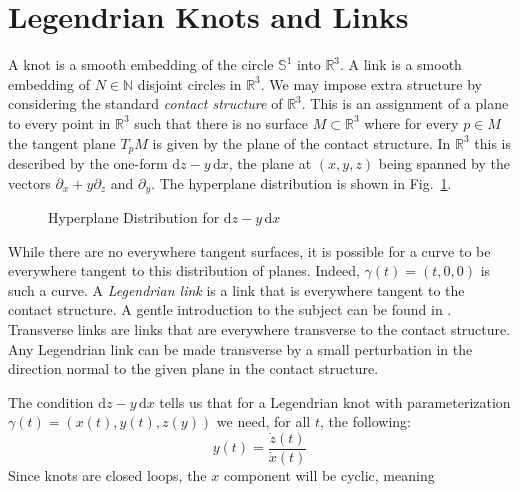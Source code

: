 \documentclass{article}
\theoremstyle{plain}
\begin{document}
    \section{Legendrian Knots and Links}
        A knot is a smooth embedding of the circle $\mathbb{S}^{1}$ into
        $\mathbb{R}^{3}$. A link is a smooth embedding of $N\in\mathbb{N}$
        disjoint circles in $\mathbb{R}^{3}$. We may impose
        extra structure by considering the standard \textit{contact structure}
        of $\mathbb{R}^{3}$. This is an assignment
        of a plane to every point in $\mathbb{R}^{3}$ such that there is no
        surface $M\subset\mathbb{R}^{3}$ where for every $p\in{M}$ the tangent
        plane $T_{p}M$ is given by the plane of the contact structure. In
        $\mathbb{R}^{3}$ this is described by the one-form
        $\textrm{d}z-y\,\textrm{d}x$, the plane at $(x,y,z)$ being spanned by
        the vectors $\partial_{x}+y\partial_{z}$ and $\partial_{y}$. The
        hyperplane distribution is shown in Fig.~\ref{fig:darboux_form_001}.
        \begin{figure}
            \centering
            \caption{Hyperplane Distribution for $\textrm{d}z-y\,\textrm{d}x$}
            \label{fig:darboux_form_001}
        \end{figure}
        While there are no everywhere tangent surfaces, it is possible for a
        curve to be everywhere tangent to this distribution of planes. Indeed,
        $\gamma(t)=(t,0,0)$ is such a curve.
        A \textit{Legendrian link} is a link that is everywhere tangent to
        the contact structure. A gentle introduction to the subject can be found
        in \cite{JoshuaMSabloffWhatIsLegendrianKnot}. Transverse links are links
        that are everywhere transverse to the contact structure. Any Legendrian
        link can be made transverse by a small perturbation in the direction
        normal to the given plane in the contact structure.
        \par\hfill\par
        The condition $\textrm{d}z-y\,\textrm{d}x$ tells us that for a
        Legendrian knot with parameterization $\gamma(t)=(x(t),y(t),z(y))$ we
        need, for all $t$, the following:
        \begin{equation}
            y(t)=\frac{\dot{z}(t)}{\dot{x}(t)}
        \end{equation}
        Since knots are closed loops, the $x$ component will be cyclic, meaning
\end{document}
